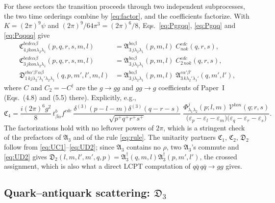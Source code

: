 \documentclass[11pt,a4paper]{article}
\numberwithin{equation}{section}
\newcommand{\mf}[1]{\mathfrak{#1}}
\newcommand{\eps}{\varepsilon}
\newcommand{\dg}{\dagger}
\newcommand{\dthree}{\delta^{(3)}}
\newcommand{\Ph}{\Phi}
\newcommand{\Vg}{\mathcal{V}}
\begin{document}
For these sectors the transition proceeds through two independent subprocesses, the two time
orderings combine by \eqref{eq:factor}, and the coefficients factorize. With
$K=(2\pi)^{9}\psi$ and $(2\pi)^{9}/64\pi^{3}=(2\pi)^{6}/8$, Eqs.~\eqref{eq:Pggqq}, \eqref{eq:Pgqq}
and \eqref{eq:Pqqqq} give
\begin{align}
\mf C^{bcde\alpha\beta}_{4\,jkon\lambda_{2}\lambda_{1}}(p,q,r,s,m,l)&=
\mf A^{b\alpha\beta}_{3\,j\lambda_{2}\lambda_{1}}(p,m,l)\;C^{edc}_{nok}(q,r,s),
\label{eq:C4}\\
\mf C^{bcde\alpha\beta}_{3\,jkon\lambda_{2}\lambda_{1}}(p,q,r,s,m,l)&=
\mf A^{b\alpha\beta}_{3\,j\lambda_{2}\lambda_{1}}(p,m,l)\;C^{edc}_{2\,nok}(q,r,s),
\label{eq:C3}\\
\mf D^{cb\alpha'\beta'\alpha\beta}_{1\,kj\lambda_{2}'\lambda_{1}'\lambda_{2}\lambda_{1}}(q,p,m',l',m,l)&=
\mf A^{b\alpha\beta}_{3\,j\lambda_{2}\lambda_{1}}(p,m,l)\;\mf A^{c\alpha'\beta'}_{3\,k\lambda_{2}'\lambda_{1}'}(q,m',l'),
\label{eq:D1}
\end{align}
where $C$ and $C_{2}=-C^{\dg}$ are the $g\to gg$ and $gg\to g$ coefficients of Paper~I
(Eqs.~(4.8) and (5.5) there). Explicitly, e.g.,
\begin{equation}
\mf C_{4}=\frac{i(2\pi)^{6}g^{2}}{8}\,t^{b}_{\beta\alpha}f^{cde}\,
\frac{\dthree(p-l-m)\dthree(q-r-s)}{\sqrt{p^{+}q^{+}r^{+}s^{+}}}\;
\frac{\Ph^{j}_{\lambda_{1}\lambda_{2}}(p;l,m)\,\Vg^{kon}(q;r,s)}
{\big(\eps_{p}-\eps_{l}-\eps_{m}\big)\big(\eps_{q}-\eps_{r}-\eps_{s}\big)} .
\end{equation}
The factorizations hold with no leftover powers of $2\pi$, which is a stringent check of the
prefactors of $\mf A_{3}$ and of the rule \eqref{eq:rule}. The unitarity partners
$\mf C_{1}$, $\mf C_{2}$, $\mf D_{2}$ follow from \eqref{eq:UC1}--\eqref{eq:UD2}; since $\mf A_{3}$ contains no
$\rho$, two $\mf A_{3}$'s commute and \eqref{eq:UD2} gives
$\mf D_{2}(l,m,l',m',q,p)=\mf A^{\dg}_{3}(q,m,l)\mf A^{\dg}_{3}(p,m',l')$, the crossed assignment, which is
also what a direct LCPT computation of $q\bar q\,q\bar q\to gg$ gives.

\subsection{Quark--antiquark scattering: $\mf D_{3}$}
\end{document}
